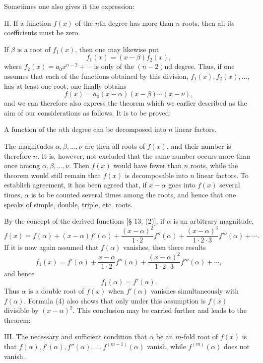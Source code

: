 \documentclass[11pt]{article}
\begin{document}
Sometimes one also gives it the expression:

\medskip
\noindent II. If a function $f(x)$ of the $n$th degree has more than $n$ roots, then all its coefficients must be zero.
\medskip

If $\beta$ is a root of $f_1(x)$, then one may likewise put
\[
 f_1(x)=(x-\beta)f_2(x),
\]
where $f_2(x)=a_0x^{n-2}+\cdots$ is only of the $(n-2)$nd degree. Thus, if one assumes that each of the functions obtained by this division, $f_1(x), f_2(x),\ldots$, has at least one root, one finally obtains
\begin{equation}
 f(x)=a_0(x-\alpha)(x-\beta)\cdots(x-\nu),
\tag{3}
\end{equation}
and we can therefore also express the theorem which we earlier described as the aim of our considerations as follows. It is to be proved:

\medskip
\noindent A function of the $n$th degree can be decomposed into $n$ linear factors.
\medskip

The magnitudes $\alpha,\beta,\ldots,\nu$ are then all roots of $f(x)$, and their number is therefore $n$. It is, however, not excluded that the same number occurs more than once among $\alpha,\beta,\ldots,\nu$. Then $f(x)$ would have fewer than $n$ roots, while the theorem would still remain that $f(x)$ is decomposable into $n$ linear factors. To establish agreement, it has been agreed that, if $x-\alpha$ goes into $f(x)$ several times, $\alpha$ is to be counted several times among the roots, and hence that one speaks of simple, double, triple, etc. roots.

By the concept of the derived functions [§ 13, (2)], if $\alpha$ is an arbitrary magnitude,
\begin{equation}
 f(x)=f(\alpha)+(x-\alpha)f'(\alpha)+\frac{(x-\alpha)^2}{1\cdot2}f''(\alpha)
 +\frac{(x-\alpha)^3}{1\cdot2\cdot3}f'''(\alpha)+\cdots .
\tag{4}
\end{equation}
If it is now again assumed that $f(\alpha)$ vanishes, then there results
\[
 f_1(x)=f'(\alpha)+\frac{x-\alpha}{1\cdot2}f''(\alpha)+\frac{(x-\alpha)^2}{1\cdot2\cdot3}f'''(\alpha)+\cdots,
\]
and hence
\[
 f_1(\alpha)=f'(\alpha).
\]
Thus $\alpha$ is a double root of $f(x)$ when $f'(\alpha)$ vanishes simultaneously with $f(\alpha)$. Formula (4) also shows that only under this assumption is $f(x)$ divisible by $(x-\alpha)^2$. This conclusion may be carried further and leads to the theorem:

\medskip
\noindent III. The necessary and sufficient condition that $\alpha$ be an $m$-fold root of $f(x)$ is that $f(\alpha),f'(\alpha),f''(\alpha),\ldots,f^{(m-1)}(\alpha)$ vanish, while $f^{(m)}(\alpha)$ does not vanish.
\end{document}
